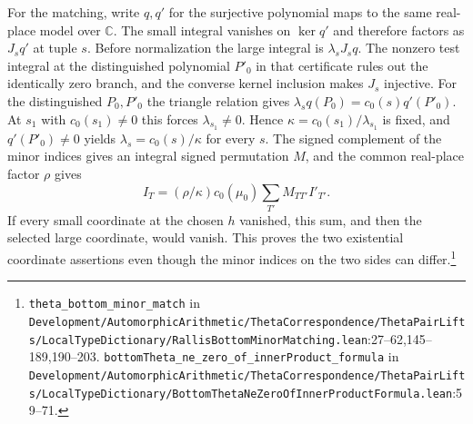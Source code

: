 For the matching, write $q,q'$ for the surjective polynomial maps to the same real-place model over $\mathbb C$. The small integral vanishes on $\ker q'$ and therefore factors as $J_s q'$ at tuple $s$. Before normalization the large integral is $\lambda_s J_s q$. The nonzero test integral at the distinguished polynomial $P'_0$ in that certificate rules out the identically zero branch, and the converse kernel inclusion makes $J_s$ injective. For the distinguished $P_0,P'_0$ the triangle relation gives $\lambda_s q(P_0)=c_0(s)q'(P'_0)$. At $s_1$ with $c_0(s_1)\ne0$ this forces $\lambda_{s_1}\ne0$. Hence $\kappa=c_0(s_1)/\lambda_{s_1}$ is fixed, and $q'(P'_0)\ne0$ yields $\lambda_s=c_0(s)/\kappa$ for every $s$. The signed complement of the minor indices gives an integral signed permutation $M$, and the common real-place factor $\rho$ gives
\[
 I_T=(\rho/\kappa)c_0(\mu_0)\sum_{T'}M_{TT'}I'_{T'} .
\]
If every small coordinate at the chosen $h$ vanished, this sum, and then the selected large coordinate, would vanish. This proves the two existential coordinate assertions even though the minor indices on the two sides can differ.\footnote{\nolinkurl{theta_bottom_minor_match} in \nolinkurl{Development/AutomorphicArithmetic/ThetaCorrespondence/ThetaPairLifts/LocalTypeDictionary/RallisBottomMinorMatching.lean}\allowbreak:27--62,145--189,190--203. \nolinkurl{bottomTheta_ne_zero_of_innerProduct_formula} in \nolinkurl{Development/AutomorphicArithmetic/ThetaCorrespondence/ThetaPairLifts/LocalTypeDictionary/BottomThetaNeZeroOfInnerProductFormula.lean}\allowbreak:59--71.}

